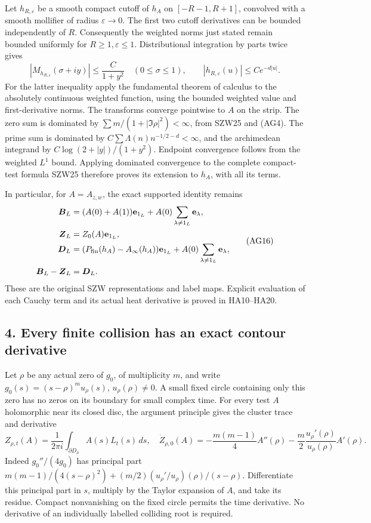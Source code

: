 \documentclass[
  10pt,
  a4paper,
]{article}
\begin{document}
Let \(h_{R,\varepsilon}\) be a smooth compact cutoff of \(h_A\) on
\([-R-1,R+1]\), convolved with a smooth mollifier of radius
\(\varepsilon\to0\). The first two cutoff derivatives can be bounded
independently of \(R\). Consequently the weighted norms just stated
remain bounded uniformly for \(R\ge1,\varepsilon\le1\). Distributional
integration by parts twice gives \[
|M_{h_{R,\varepsilon}}(\sigma+iy)|\le\frac{C}{1+y^2}
\quad(0\le\sigma\le1),\qquad
|h_{R,\varepsilon}(u)|\le Ce^{-d|u|}.
\tag{AG15}
\] For the latter inequality apply the fundamental theorem of calculus
to the absolutely continuous weighted function, using the bounded
weighted value and first-derivative norms. The transforms converge
pointwise to \(A\) on the strip. The zero sum is dominated by
\(\sum m/(1+|\Im\rho|^2)<\infty\), from SZW25 and (AG4). The prime sum
is dominated by \(C\sum\Lambda(n)n^{-1/2-d}<\infty\), and the
archimedean integrand by \(C\log(2+|y|)/(1+y^2)\). Endpoint convergence
follows from the weighted \(L^1\) bound. Applying dominated convergence
to the complete compact-test formula SZW25 therefore proves its
extension to \(h_A\), with all its terms.

In particular, for \(A=A_{z,w}\), the exact supported identity remains
\[
\begin{aligned}
\boldsymbol B_L&=(A(0)+A(1))\mathbf e_{1_L}
+A(0)\sum_{\lambda\ne1_L}\mathbf e_\lambda,\\
\boldsymbol Z_L&=Z_0(A)\mathbf e_{1_L},\\
\boldsymbol D_L&=(P_{\rm fin}(h_A)-A_\infty(h_A))\mathbf e_{1_L}
+A(0)\sum_{\lambda\ne1_L}\mathbf e_\lambda,\\
\boldsymbol B_L-\boldsymbol Z_L&=\boldsymbol D_L.
\end{aligned}\tag{AG16}
\] These are the original SZW representations and label maps. Explicit
evaluation of each Cauchy term and its actual heat derivative is proved
in HA10--HA20.

\subsection{4. Every finite collision has an exact contour
derivative}\label{every-finite-collision-has-an-exact-contour-derivative}

Let \(\rho\) be any actual zero of \(g_0\), of multiplicity \(m\), and
write \(g_0(s)=(s-\rho)^mu_\rho(s)\), \(u_\rho(\rho)\ne0\). A small
fixed circle containing only this zero has no zeros on its boundary for
small complex time. For every test \(A\) holomorphic near its closed
disc, the argument principle gives the cluster trace and derivative \[
Z_{\rho,t}(A)=\frac1{2\pi i}\int_{\partial D_\rho}A(s)L_t(s)\,ds,
\quad
\dot Z_{\rho,0}(A)
=-\frac{m(m-1)}4A''(\rho)
-\frac m2\frac{u_\rho'(\rho)}{u_\rho(\rho)}A'(\rho).
\tag{AG17}
\] Indeed \(g_0''/(4g_0)\) has principal part
\(m(m-1)/(4(s-\rho)^2)+(m/2)(u_\rho'/u_\rho)(\rho)/(s-\rho)\).
Differentiate this principal part in \(s\), multiply by the Taylor
expansion of \(A\), and take its residue. Compact nonvanishing on the
fixed circle permits the time derivative. No derivative of an
individually labelled colliding root is required.
\end{document}
